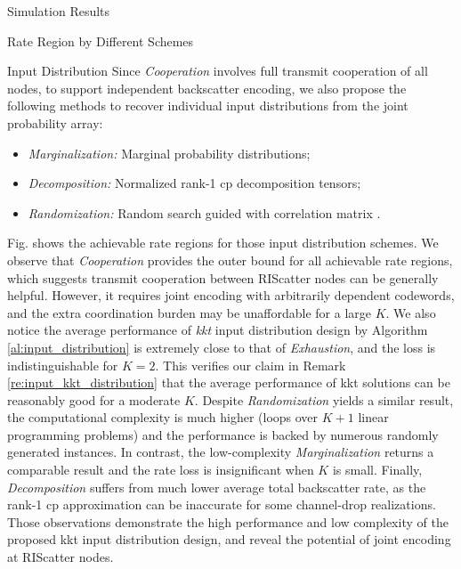 \documentclass[journal]{IEEEtran}
\begin{document}
\begin{section}{Simulation Results}
\begin{subsection}{Rate Region by Different Schemes}
\begin{subsubsection}{Input Distribution}
			Since \emph{Cooperation} involves full transmit cooperation of all nodes, to support independent backscatter encoding, we also propose the following methods to recover individual input distributions from the joint probability array:
			\begin{itemize}
				\item \emph{Marginalization:} Marginal probability distributions;
				\item \emph{Decomposition:} Normalized rank-\num{1} \gls{cp} decomposition tensors;
				\item \emph{Randomization:} Random search guided with correlation matrix \cite{Calvo2010}.
			\end{itemize}

			Fig.  shows the achievable rate regions for those input distribution schemes.
			We observe that \emph{Cooperation} provides the outer bound for all achievable rate regions, which suggests transmit cooperation between RIScatter nodes can be generally helpful.
			However, it requires joint encoding with arbitrarily dependent codewords, and the extra coordination burden may be unaffordable for a large $K$.
			We also notice the average performance of \emph{\gls{kkt}} input distribution design by Algorithm \ref{al:input_distribution} is extremely close to that of \emph{Exhaustion}, and the loss is indistinguishable for $K=2$.
			This verifies our claim in Remark \ref{re:input_kkt_distribution} that the average performance of \gls{kkt} solutions can be reasonably good for a moderate $K$.
			Despite \emph{Randomization} yields a similar result, the computational complexity is much higher (loops over $K+1$ linear programming problems) and the performance is backed by numerous randomly generated instances.
			In contrast, the low-complexity \emph{Marginalization} returns a comparable result and the rate loss is insignificant when $K$ is small.
			Finally, \emph{Decomposition} suffers from much lower average total backscatter rate, as the rank-\num{1} \gls{cp} approximation can be inaccurate for some channel-drop realizations.
			Those observations demonstrate the high performance and low complexity of the proposed \gls{kkt} input distribution design, and reveal the potential of joint encoding at RIScatter nodes.
		\end{subsubsection}



\end{subsection}
\end{section}
\end{document}
